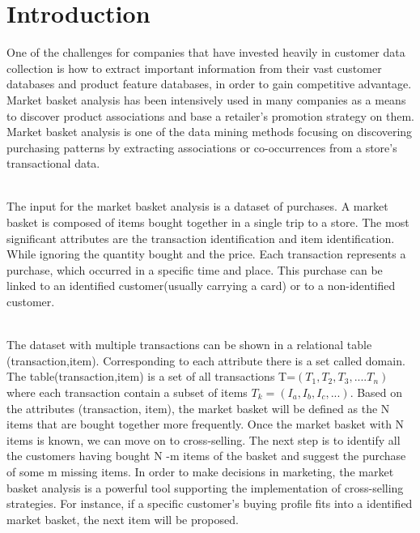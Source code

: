 \documentclass{article}\usepackage[]{graphicx}\usepackage[]{color}
\begin{document}
\section{Introduction} 
\hspace{0.9cm} One of the challenges for companies that have invested heavily in customer data collection is how to extract important information from their vast customer databases and product feature databases, in order to gain competitive advantage. Market basket analysis has been intensively used in many companies as a means to discover product associations and base a retailer’s promotion strategy on them. Market basket analysis is one of the data mining methods focusing on discovering purchasing patterns by extracting associations or co-occurrences from a store’s transactional  data\cite{[1]}.\par\\
\hspace{0.5cm}The input for the market basket analysis is a dataset of purchases. A market basket is 
composed of items bought together in a single trip to a store. The most significant attributes are the transaction identification and item identification. While ignoring the quantity bought and the price. Each transaction represents a purchase, which occurred in a specific time and place. This purchase can be linked to an identified customer(usually carrying a card) or to a non-identified customer.\par\\
\hspace{0.5cm}The dataset with multiple transactions can be shown in a relational table (transaction,item). Corresponding to each attribute there is a set called domain. The table(transaction,item) is a set of all
transactions T=${(T_{1},T_{2},T_{3},....T_{n})}$ where each transaction contain a subset of items $T_{k}={(I_{a},I_{b},I_{c},...)}$\cite{[2]}. Based on the attributes (transaction, item), the market basket will be defined as the N items that are bought together more frequently. Once the market basket with N items is known, we can move on to cross-selling. The next step is to identify all the customers having bought N
-m items of the basket and suggest the purchase of some m missing items. In order to make decisions in marketing, the market basket analysis is a powerful tool supporting the implementation of cross-selling strategies. For instance, if a specific customer's buying profile fits into a identified market basket, the next item will be proposed.\par\\
\end{document}
